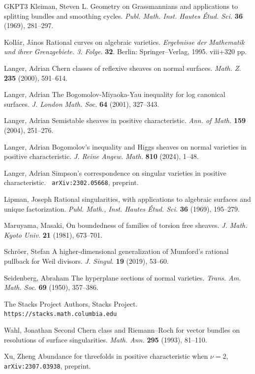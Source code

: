 \documentclass[twoside, 11pt]{article}
\theoremstyle{plain}
\theoremstyle{definition}
\theoremstyle{remark}
\begin{document}
\begin{thebibliography}{GKPT3}
 Kleiman, Steven L.
Geometry on Grassmannians and applications to splitting bundles and smoothing cycles. 
\emph{Publ. Math. Inst. Hautes \'Etud. Sci.} {\bf 36} (1969), 281--297.

 Koll\'ar, J\'anos Rational curves on algebraic varieties.
\emph{Ergebnisse der Mathematik und ihrer Grenzgebiete. 3. Folge.} {\bf 32}. Berlin: Springer--Verlag,
1995.  viii+320 pp.

 Langer, Adrian Chern classes of reflexive sheaves on normal surfaces. 
\emph{Math. Z.} {\bf 235} (2000), 591--614.


 Langer, Adrian The Bogomolov-Miyaoka-Yau inequality for log canonical surfaces.
\emph{J. London Math. Soc.} {\bf 64} (2001), 327--343.


 Langer, Adrian Semistable sheaves in positive characteristic. 
\emph{Ann. of Math.} {\bf 159} (2004), 251--276.

 Langer, Adrian Bogomolov's inequality and Higgs sheaves on normal varieties in positive characteristic. \emph{J. Reine Angew. Math.} {\bf 810} (2024), 1--48.

 Langer, Adrian Simpson's correspondence on singular varieties in positive characteristic. {\tt
arXiv:2302.05668}, preprint.

 Lipman, Joseph  Rational singularities, with applications to algebraic surfaces and unique factorization.
\emph{Publ. Math., Inst. Hautes \'Etud. Sci.} {\bf 36} (1969), 195--279.

 Maruyama, Masaki, On boundedness of families of torsion free sheaves.
 \emph{J. Math. Kyoto Univ.} {\bf 21} (1981), 673--701.

 Schr\"oer, Stefan
A higher-dimensional generalization of Mumford's rational pullback for Weil divisors.
\emph{J. Singul.} {\bf 19} (2019), 53--60.

  Seidenberg, Abraham The hyperplane sections of normal varieties.  
 \emph{Trans. Am. Math. Soc.} {\bf 69} (1950), 357--386.


 {The {Stacks Project Authors}}, Stacks Project. {\tt https://stacks.math.columbia.edu}
  
  
  Wahl, Jonathan Second Chern class and Riemann--Roch for vector bundles 
 on resolutions of surface singularities. \emph{Math. Ann.} {\bf 295} (1993), 81--110.

 Xu, Zheng Abundance for threefolds in positive characteristic when $\nu=2$, {\tt arXiv:2307.03938}, preprint.


\end{thebibliography}
\end{document}
